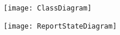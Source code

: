 \begin{figure}[H]
	\centering
	\texttt{[image: ClassDiagram]}
\end{figure}

\begin{figure}[H]
	\centering
	\texttt{[image: ReportStateDiagram]}
\end{figure}
